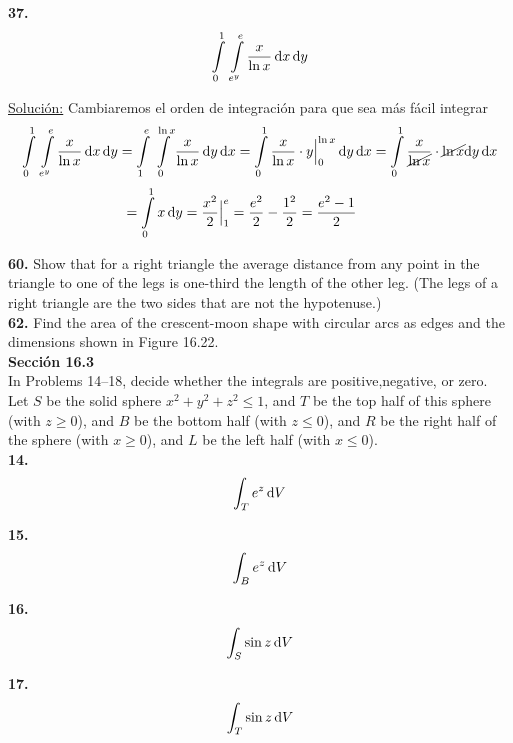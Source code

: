 \documentclass[11pt]{report}
\newcommand{\s}{\underline{Soluci\'{o}n:}}
\begin{document}
\textbf{37.} \\

\[ \int \limits_0^1 \, \int \limits_{e^y}^e \frac{x}{\ln{x}} \, \text dx \,
   \text dy \]

\s
Cambiaremos el orden de integraci\'{o}n para que sea m\'{a}s f\'{a}cil integrar
\[\int \limits_0^1 \, \int \limits_{e^y}^e \frac{x}{\ln{x}} \, \text dx \,
   \text dy  =
   \int \limits_1^e \, \int \limits_{0}^{\ln{x}} \frac{x}{\ln{x}} \, \text dy \,
      \text dx
  = \int \limits_0^1 \frac{x}{\ln{x}} \cdot y  \Big|^{\ln{x}}_{0}\, \text dy \,\text dx
  = \int \limits_0^1 \frac{x}{\cancel{\ln{x}}} \cdot \cancel{\ln{x}} \text dy \,\text dx \]
\[\hspace{-0.9cm}= \int \limits_0^1 x \, \text dy
  = \frac{x^2}{2}\Big|^{e}_{1}
  = \frac{e^2}{2} - \frac{1^2}{2}
  = \frac{e^2-1}{2}\]

\textbf{60.} Show that for a right triangle the average distance from any point
in the triangle to one of the legs is one-third the length of the other leg.
(The legs of a right triangle are the two sides that are not the hypotenuse.) \\

\textbf{62.} Find the area of the crescent-moon shape with circular arcs as edges
and the dimensions shown in Figure 16.22. \\

\textbf{Sección 16.3} \\

In Problems 14–18, decide whether the integrals are positive,negative, or zero.
Let $S$ be the solid sphere $x^2 + y^2 + z^2 \leq 1$, and $T$ be the top half of
this sphere (with $z \geq 0$), and $B$ be the bottom half (with $z \leq 0$), and $R$
be the right half of the sphere (with $x \geq 0$), and $L$ be the left half
(with $x \leq 0$). \\

\textbf{14.} \\

\[ \int _T e^z \, \text dV \]

\textbf{15.} \\

\[ \int _B e^z \, \text dV \]

\textbf{16.} \\

\[ \int _S \sin{z} \, \text dV \]

\textbf{17.} \\

\[ \int _T \sin{z} \, \text dV \]
\end{document}
